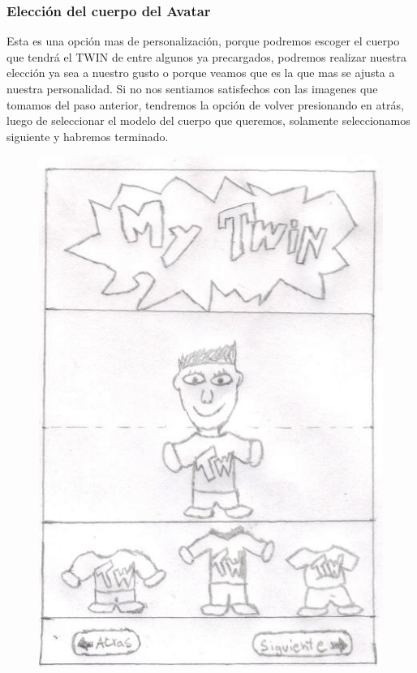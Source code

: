 \documentclass[12pt]{article}
\begin{document}
\newpage
\subsubsection{Elecci\'on del cuerpo del Avatar}
Esta es una opci\'on mas de personalizaci\'on, porque podremos escoger el cuerpo que tendr\'a el TWIN de entre algunos ya precargados, podremos realizar nuestra elecci\'on ya sea a nuestro gusto o porque veamos que es la que mas se ajusta a nuestra personalidad. 
Si no nos sentiamos satisfechos con las imagenes que tomamos del paso anterior, tendremos la opci\'on de volver presionando en atr\'as, luego de seleccionar el modelo del cuerpo que queremos, solamente seleccionamos siguiente y habremos terminado.

\begin{figure}[h]
\centering
\vspace{0.3in}\includegraphics[scale=0.5]{Twin2}
\end{figure}
\end{document}
